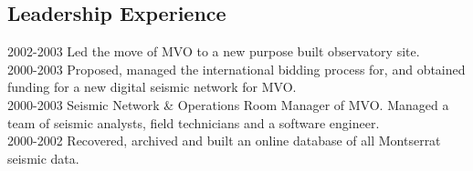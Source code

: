 \documentclass[margin,line]{res}
\begin{document}
\begin{resume}
\section{\sc Leadership Experience}
2002-2003 Led the move of MVO to a new purpose built observatory site.\\
2000-2003 Proposed, managed the international bidding process for, and obtained funding for a new digital seismic network for MVO.\\
2000-2003 Seismic Network \& Operations Room Manager of MVO. Managed a team of seismic analysts, field technicians and a software engineer.\\
2000-2002 Recovered, archived and built an online database of all Montserrat seismic data.\\

\begin{comment}

\end{comment}
\end{resume}
\end{document}
